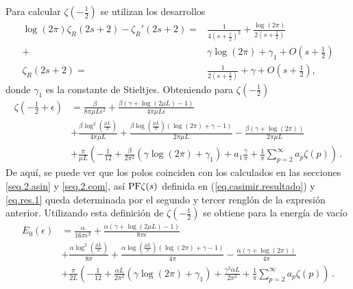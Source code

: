 Para calcular $\zeta \left( - \frac{1}{2} \right)$ se utilizan los desarrollos
\begin{align}\label{cortar}
	\log (2 \pi) \zeta _R (2s+2) -
	\zeta _R ' (2s+2) = & 
	\frac{1}{4 \left( s + \frac{1}{2} \right) ^2} + 
	\frac{ \log (2 \pi ) }{2 \left( s + \frac{1}{2} \right) } 
\\ \nonumber
	+ &  \gamma \log (2 \pi ) + \gamma _1 + O \left( s + \frac{1}{2} \right) \\
	\zeta _R (2s+2) = &\frac{1}{2 \left( s + \frac{1}{2} \right)} + \gamma + O \left( s + \frac{1}{2} \right)
	 ,
\end{align}
donde $\gamma _1$ es la constante de Stieltjes. Obteniendo para $\zeta \left( - \frac{1}{2} \right) $
\begin{align}\label{eq.zeta.final}
\zeta \left( - \frac{1}{2} + \epsilon \right) &=
		\frac{\beta}{8  \pi \mu L \epsilon ^2}	 +
	    \frac{
	    	\beta ( \gamma  +  \log (2 \mu L ) -1 ) }
	    	{4  \pi \mu L \epsilon } 
\\[5pt]
\nonumber
&
+
		\frac{\beta \log ^2 \left( \frac{\mu L}{\pi} \right)}{4 \pi \mu L}  +
		\frac{
			\beta \log \left( \frac{\mu L}{\pi}\right)
				( \log (2 \pi ) + \gamma -1)}
			{2 \pi \mu L}  
- \frac{\beta (\gamma + \log(2 \pi) )}{2 \pi \mu L}
\\[5pt]
\nonumber
&
+
\frac{\pi}{\mu L}  
					\left(
							- \frac{1}{12} +
							\frac{\beta}{2 \pi ^2} \left(
														\gamma \log (2 \pi)
														+ \gamma _1
														\right) +
								a _1 \frac{\gamma}{\pi} +
								\frac{1}{\pi} \sum _{p=2} ^{\infty}
								a_p \zeta (p) 
							\right) 
\, .
\end{align}
De aquí, se puede ver que los polos coinciden con los calculados en las secciones \ref{seq.2.asin} y \ref{seq.2.com}, así ${\rm PF} \zeta (s)$ definida en (\ref{eq.casimir.resultado}) y \eqref{eq.res.1} queda determinada por el segundo y tercer renglón de la expresión anterior. 
Utilizando esta definición de $\zeta \left( - \frac{1}{2} \right) $ se obtiene para la energía de vacío
\begin{align}\label{energia.vacio.final}
	E_ 0 (\epsilon )&=
		\frac{\alpha}{16  \pi  \epsilon ^2}	 
		+   \frac{
	    	\alpha ( \gamma  +  \log (2\mu L ) -1 ) }
	    	{8  \pi \epsilon } 
\\[5pt]
\nonumber
&+
	\frac{\alpha \log ^2 \left( \frac{\mu L}{\pi} \right)}{8 \pi}  +
		\frac{ 
			\alpha \log \left( \frac{\mu L}{\pi}\right)
				( \log (2 \pi ) + \gamma -1)}
			{4 \pi }  
	- \frac{\alpha (\gamma + \log (2 \pi ) )}{4 \pi}
\\[5pt]
\nonumber
&
+
	\frac{\pi}{2 L}  
			\left(
				- \frac{1}{12} +
				\frac{\alpha L}{2 \pi ^2} 
				\left(
					\gamma \log (2 \pi)
					+ \gamma _1
					\right) +
								\frac{\gamma ^2 \alpha L}{2 \pi ^2} +
								\frac{1}{\pi} \sum _{p=2} ^{\infty}
								a_p \zeta (p) 
							\right) 
\, .
\end{align}
